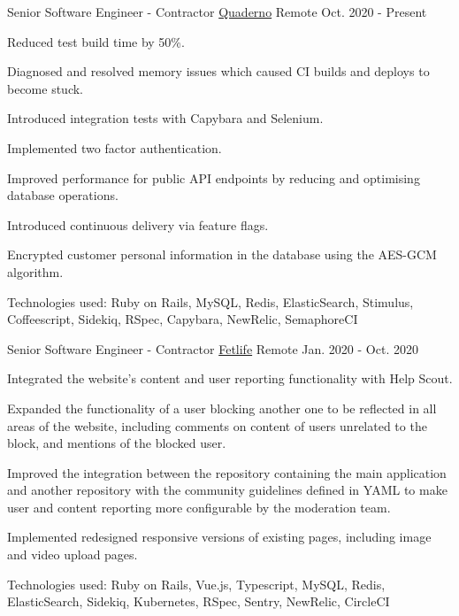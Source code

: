 \documentclass[11pt, a4paper]{awesome-cv}
\begin{document}
\begin{cventries}


  \cventry
    {Senior Software Engineer - Contractor} %
    {\href{https://quaderno.io/}{Quaderno}} %
    {Remote} %
    {Oct. 2020 - Present}
    {
      \begin{cvitems} %
        \item {Reduced test build time by 50\%.}
        \item {Diagnosed and resolved memory issues which caused CI builds and deploys to become stuck.}
        \item {Introduced integration tests with Capybara and Selenium.}
        \item {Implemented two factor authentication.}
        \item {Improved performance for public API endpoints by reducing and optimising database operations.}
        \item {Introduced continuous delivery via feature flags.}
        \item {Encrypted customer personal information in the database using the AES-GCM algorithm.}
        \item {Technologies used: Ruby on Rails, MySQL, Redis, ElasticSearch, Stimulus, Coffeescript, Sidekiq, RSpec, Capybara, NewRelic, SemaphoreCI}
      \end{cvitems}
    }

  \cventry
    {Senior Software Engineer - Contractor} %
    {\href{https://www.fetlife.com/}{Fetlife}} %
    {Remote} %
    {Jan. 2020 - Oct. 2020}
    {
      \begin{cvitems} %
        \item {Integrated the website's content and user reporting functionality with Help Scout.}
        \item {Expanded the functionality of a user blocking another one to be reflected in all areas of the website, including comments on content of users unrelated to the block, and mentions of the blocked user.}
        \item {Improved the integration between the repository containing the main application and another repository with the community guidelines defined in YAML to make user and content reporting more configurable by the moderation team.}
        \item {Implemented redesigned responsive versions of existing pages, including image and video upload pages.}
        \item {Technologies used: Ruby on Rails, Vue.js, Typescript, MySQL, Redis, ElasticSearch, Sidekiq, Kubernetes, RSpec, Sentry, NewRelic, CircleCI}
      \end{cvitems}
    }


\end{cventries}
\end{document}
